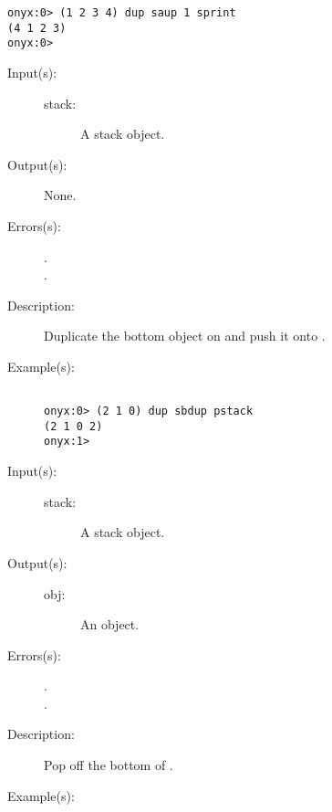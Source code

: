 \begin{description}
\begin{description}
\begin{verbatim}
onyx:0> (1 2 3 4) dup saup 1 sprint
(4 1 2 3)
onyx:0>
		\end{verbatim}
	\end{description}
\label{systemdict:sbdup}
\item[{\onyxop{stack}{sbdup}{--}}: ]
	\begin{description}\item[]
	\item[Input(s): ]
		\begin{description}\item[]
		\item[stack: ]
			A stack object.
		\end{description}
	\item[Output(s): ] None.
	\item[Errors(s): ]
		\begin{description}\item[]
		\item[.]
		\item[.]
		\end{description}
	\item[Description: ]
		Duplicate the bottom object on  and push it onto
		.
	\item[Example(s): ]\begin{verbatim}

onyx:0> (2 1 0) dup sbdup pstack
(2 1 0 2)
onyx:1>
		\end{verbatim}
	\end{description}
\label{systemdict:sbpop}
\item[{\onyxop{stack}{sbpop}{obj}}: ]
	\begin{description}\item[]
	\item[Input(s): ]
		\begin{description}\item[]
		\item[stack: ]
			A stack object.
		\end{description}
	\item[Output(s): ]
		\begin{description}\item[]
		\item[obj: ]
			An object.
		\end{description}
	\item[Errors(s): ]
		\begin{description}\item[]
		\item[.]
		\item[.]
		\end{description}
	\item[Description: ]
		Pop  off the bottom of .
	\item[Example(s): ]\begin{verbatim}


\end{verbatim}
\end{description}
\end{description}
